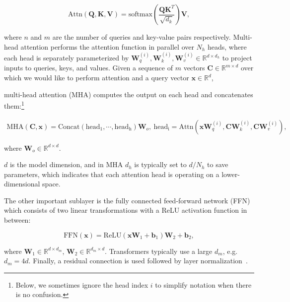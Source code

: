 \begin{equation}
    \mathrm{Attn}({\bm{Q}}, {\bm{K}}, {\bm{V}}) = \text{softmax}(\frac{{\bm{Q}}{\bm{K}}^T}{\sqrt{d_k}}){\bm{V}},
\end{equation}

where $n$ and $m$ are the number of queries and key-value pairs respectively. Multi-head attention performs the attention function in parallel over $N_h$ heads, where each head is separately parameterized by ${\bm{W}}_q^{(i)}, {\bm{W}}_k^{(i)}, {\bm{W}}_v^{(i)} \in {\mathbb{R}}^{d\times d_h}$ to project inputs to queries, keys, and values. Given a sequence of $m$ vectors ${\bm{C}} \in {\mathbb{R}}^{m\times d}$ over which we would like to perform attention and a query vector ${\bm{x}}\in{\mathbb{R}}^d$, 

multi-head attention (MHA) computes the output on each head and concatenates them:\footnote{Below, we sometimes ignore the head index $i$ to simplify notation when there is no confusion.}

\begin{equation}
\begin{aligned}
    \mathrm{MHA}({\bm{C}}, {\bm{x}}) =  \mathrm{Concat(head_1, \cdots, head_h)}{\bm{W}}_o, \
    \mathrm{head_i} = \mathrm{Attn}({\bm{x}}{\bm{W}}_q^{(i)}, {\bm{C}}{\bm{W}}_k^{(i)}, {\bm{C}}{\bm{W}}_v^{(i)}), 
    \label{eq:multihead:attn}
\end{aligned}
\end{equation}

where ${\bm{W}}_o \in {\mathbb{R}}^{d\times d}$.

$d$ is the model dimension, and in MHA $d_h$ is typically set to $d / N_h$ to save parameters, which indicates that each attention head is operating on a lower-dimensional space. 

The other important sublayer is the fully connected feed-forward network (FFN) which consists of two linear transformations with a ReLU activation function in between:

\begin{equation}
    \mathrm{FFN}({\bm{x}}) = \mathrm{ReLU}({\bm{x}}{\bm{W}}_1 +{\bm{b}}_1){\bm{W}}_2 + {\bm{b}}_2,
\end{equation}

where ${\bm{W}}_1 \in \mathbb{R}^{d\times d_m}$, ${\bm{W}}_2 \in {\mathbb{R}}^{d_m\times d}$. Transformers typically use a large $d_m$, e.g. $d_m=4d$. Finally, a residual connection is used followed by layer normalization~\citep{ba2016layer}.

